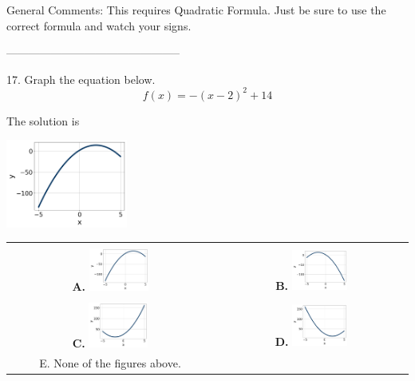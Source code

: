 \documentclass{article}[14pt]
\begin{document}
General Comments: This requires Quadratic Formula. Just be sure to use the correct formula and watch your signs.

-----------------------------------------------

17. Graph the equation below.
$$ f(x) = -(x-2)^2 + 14 $$ 

 
 The solution is  
 \begin{center} \includegraphics[width=0.3\textwidth]{../Figures/quadraticEquationToGraphAA.png} \end{center}\begin{tabular}{|c|c|} 
\hline 
 & \tabularnewline 
 \textbf{A.} \includegraphics[width=0.3\textwidth]{../Figures/quadraticEquationToGraphAA.png} & \textbf{B.} \includegraphics[width=0.3\textwidth]{../Figures/quadraticEquationToGraphBA.png} \tabularnewline 
\hline 
 & \tabularnewline 
 \textbf{C.} \includegraphics[width=0.3\textwidth]{../Figures/quadraticEquationToGraphCA.png} & \textbf{D.} \includegraphics[width=0.3\textwidth]{../Figures/quadraticEquationToGraphDA.png} \tabularnewline 
\hline 
 E. None of the figures above. & \tabularnewline 
\hline 
 \end{tabular} 
 
\end{document}

